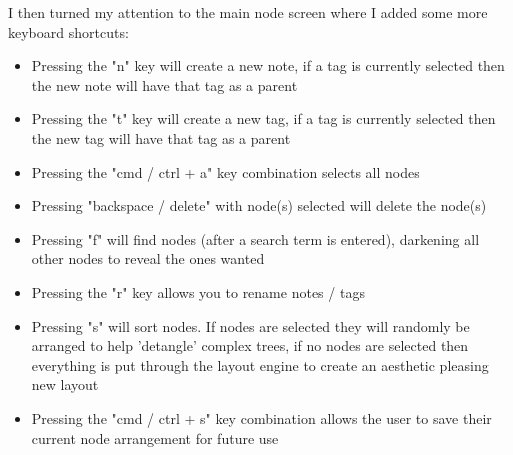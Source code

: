 I then turned my attention to the main node screen where I added some more keyboard shortcuts:
\begin{itemize}
	\item Pressing the "n" key will create a new note, if a tag is currently selected then the new note will have that tag as a parent
	\item Pressing the "t" key will create a new tag, if a tag is currently selected then the new tag will have that tag as a parent
	\item Pressing the "cmd / ctrl + a" key combination selects all nodes
	\item Pressing "backspace / delete" with node(s) selected will delete the node(s)
	\item Pressing "f" will find nodes (after a search term is entered), darkening all other nodes to reveal the ones wanted
	\item Pressing the "r" key allows you to rename notes / tags
	\item Pressing "s" will sort nodes. If nodes are selected they will randomly be arranged to help 'detangle' complex trees, if no nodes are selected then everything is put through the layout engine to create an aesthetic pleasing new layout
	\item Pressing the "cmd / ctrl + s" key combination allows the user to save their current node arrangement for future use
\end{itemize}
